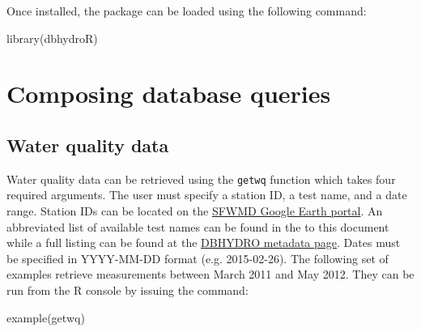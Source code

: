\documentclass[12pt,notitlepage]{article}
\begin{document}
\vspace{8pt}

\noindent Once installed, the package can be loaded using the following command:


\begin{Schunk}
\begin{Sinput}
 library(dbhydroR)
\end{Sinput}
\end{Schunk}


\section{Composing database queries}
\subsection{Water quality data}

Water quality data can be retrieved using the \texttt{getwq} function which takes four required arguments. The user must specify a station ID, a test name, and a date range. Station IDs can be located on the \href{http://my.sfwmd.gov/KMLEXT/CUSTOMKMLS/DBHydro/DBHydroKML/DBHYDRO_KML.kmz}{SFWMD Google Earth portal}. An abbreviated list of available test names can be found in the  to this document while a full listing can be found at the \href{http://my.sfwmd.gov/dbhydroplsql/show_dbkey_info.show_data_type_info}{DBHYDRO metadata page}. Dates must be specified in YYYY-MM-DD format (e.g. 2015-02-26).   The following set of examples retrieve measurements between March 2011 and May 2012. They can be run from the R console by issuing the command:

\begin{Schunk}
\begin{Sinput}
 example(getwq)
\end{Sinput}
\end{Schunk}
\end{document}
